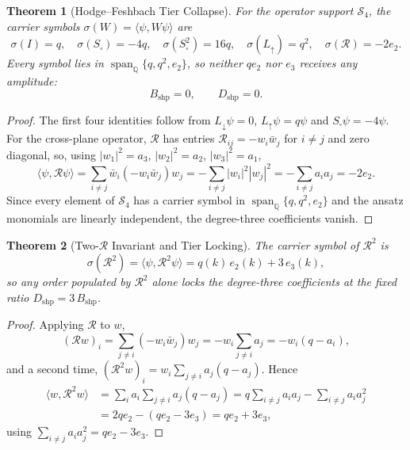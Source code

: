 \documentclass[11pt,a4paper]{article}
\newtheorem{theorem}{Theorem}[section]
\theoremstyle{definition}
\newcommand{\Q}{\mathbb{Q}}
\newcommand{\Ldn}{L_{\downarrow}}
\newcommand{\Lup}{L_{\uparrow}}
\newcommand{\Ssq}{S_{\square}}
\newcommand{\Rc}{\mathcal{R}}          %
\newcommand{\Bshp}{B_{\mathrm{shp}}}
\newcommand{\Dshp}{D_{\mathrm{shp}}}
\begin{document}
\begin{theorem}[Hodge--Feshbach Tier Collapse]\label{thm:tier_collapse}
For the operator support $\mathcal{S}_4$, the carrier symbols $\sigma(W) = \langle\psi,W\psi\rangle$ are
\begin{equation}\label{eq:carrier_symbols}
  \sigma(I) = q, \quad \sigma(\Ssq) = -4q, \quad \sigma(\Ssq^2) = 16q, \quad \sigma(\Lup) = q^2, \quad \sigma(\Rc) = -2e_2 .
\end{equation}
Every symbol lies in $\operatorname{span}_\Q\{q,q^2,e_2\}$, so neither $qe_2$ nor $e_3$ receives any amplitude:
\begin{equation}\label{eq:B_D_zero}
  \Bshp = 0, \qquad \Dshp = 0 .
\end{equation}
\end{theorem}

\begin{proof}
The first four identities follow from $\Ldn\psi = 0$, $\Lup\psi = q\psi$ and $\Ssq\psi = -4\psi$. For the cross-plane operator, $\Rc$ has entries $\Rc_{ij} = -w_i\bar w_j$ for $i\ne j$ and zero diagonal, so, using $|w_1|^2 = a_3$, $|w_2|^2 = a_2$, $|w_3|^2 = a_1$,
\begin{equation*}
  \langle\psi,\Rc\psi\rangle = \sum_{i\ne j}\bar w_i(-w_i\bar w_j)w_j = -\sum_{i\ne j}|w_i|^2|w_j|^2 = -\sum_{i\ne j}a_ia_j = -2e_2 .
\end{equation*}
Since every element of $\mathcal{S}_4$ has a carrier symbol in $\operatorname{span}_\Q\{q,q^2,e_2\}$ and the ansatz monomials are linearly independent, the degree-three coefficients vanish.
\end{proof}

\begin{theorem}[Two-$\Rc$ Invariant and Tier Locking]\label{thm:RR_locking}
The carrier symbol of $\Rc^2$ is
\begin{equation}\label{eq:sigma_RR}
  \sigma(\Rc^2) = \langle\psi,\Rc^2\psi\rangle = q(k)\,e_2(k) + 3\,e_3(k),
\end{equation}
so any order populated by $\Rc^2$ alone locks the degree-three coefficients at the fixed ratio $\Dshp = 3\,\Bshp$.
\end{theorem}

\begin{proof}
Applying $\Rc$ to $w$,
\begin{equation*}
  (\Rc w)_i = \sum_{j\ne i}(-w_i\bar w_j)w_j = -w_i\sum_{j\ne i}a_j = -w_i(q - a_i),
\end{equation*}
and a second time, $(\Rc^2 w)_i = w_i\sum_{j\ne i}a_j(q-a_j)$. Hence
\begin{align*}
  \langle w,\Rc^2 w\rangle &= \sum_{i}a_i\sum_{j\ne i}a_j(q-a_j)
   = q\sum_{i\ne j}a_ia_j - \sum_{i\ne j}a_ia_j^2 \\
   &= 2qe_2 - (qe_2 - 3e_3) = qe_2 + 3e_3,
\end{align*}
using $\sum_{i\ne j}a_ia_j^2 = qe_2 - 3e_3$.
\end{proof}
\end{document}
